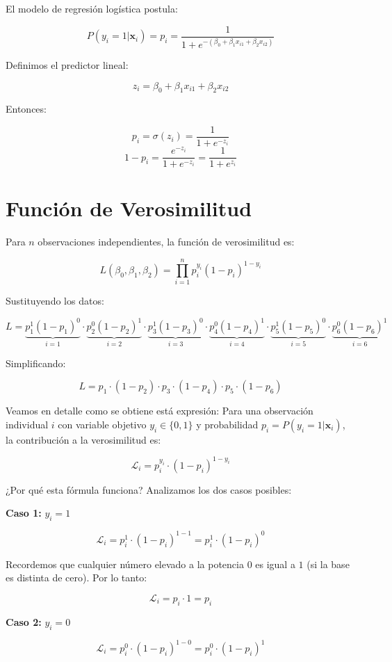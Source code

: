 \documentclass[12pt]{article}
\begin{document}
El modelo de regresión logística postula:

\[
P(y_i=1|\mathbf{x}_i) = p_i = \frac{1}{1 + e^{-(\beta_0 + \beta_1 x_{i1} + \beta_2 x_{i2})}}
\]

Definimos el predictor lineal:

\[
z_i = \beta_0 + \beta_1 x_{i1} + \beta_2 x_{i2}
\]

Entonces:

\[
p_i = \sigma(z_i) = \frac{1}{1 + e^{-z_i}}
\]
\[
1 - p_i = \frac{e^{-z_i}}{1 + e^{-z_i}} = \frac{1}{1 + e^{z_i}}
\]

\section{Función de Verosimilitud}

Para $n$ observaciones independientes, la función de verosimilitud es:

\[
L(\beta_0, \beta_1, \beta_2) = \prod_{i=1}^{n} p_i^{y_i} (1-p_i)^{1-y_i}
\]

Sustituyendo los datos:

\[
L = \underbrace{p_1^{1} (1-p_1)^{0}}_{i=1} \cdot \underbrace{p_2^{0} (1-p_2)^{1}}_{i=2} \cdot \underbrace{p_3^{1} (1-p_3)^{0}}_{i=3} \cdot \underbrace{p_4^{0} (1-p_4)^{1}}_{i=4} \cdot \underbrace{p_5^{1} (1-p_5)^{0}}_{i=5} \cdot \underbrace{p_6^{0} (1-p_6)^{1}}_{i=6}
\]

Simplificando:

\[
L = p_1 \cdot (1-p_2) \cdot p_3 \cdot (1-p_4) \cdot p_5 \cdot (1-p_6)
\]


Veamos en detalle como se obtiene está expresión: Para una observación individual $i$ con variable objetivo $y_i \in \{0,1\}$ y probabilidad $p_i = P(y_i=1|\mathbf{x}_i)$, la contribución a la verosimilitud es:

\[
\mathcal{L}_i = p_i^{y_i} \cdot (1-p_i)^{1-y_i}
\]

¿Por qué esta fórmula funciona? Analizamos los dos casos posibles:

\textbf{Caso 1:} $y_i = 1$

\[
\mathcal{L}_i = p_i^{1} \cdot (1-p_i)^{1-1} = p_i^{1} \cdot (1-p_i)^{0}
\]

Recordemos que cualquier número elevado a la potencia $0$ es igual a $1$ (si la base es distinta de cero). Por lo tanto:

\[
\mathcal{L}_i = p_i \cdot 1 = p_i
\]

\textbf{Caso 2:} $y_i = 0$

\[
\mathcal{L}_i = p_i^{0} \cdot (1-p_i)^{1-0} = p_i^{0} \cdot (1-p_i)^{1}
\]
\end{document}
